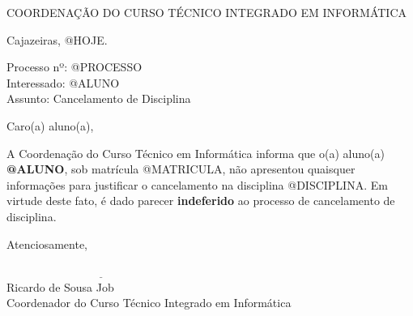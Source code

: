 \documentclass[a4paper, 12pt]{letter}
\begin{document}
{\bf
{\selectfont
    \begin{center}
        {\selectfont
            COORDENAÇÃO DO CURSO TÉCNICO INTEGRADO EM INFORMÁTICA
        }
    \end{center}
}

\begin{flushright}
Cajazeiras, @HOJE.
\end{flushright}

\noindent Processo nº: @PROCESSO\\
Interessado: @ALUNO\\
Assunto: Cancelamento de Disciplina


\noindent Caro(a) aluno(a),

\onehalfspacing A Coordenação do Curso Técnico em Informática informa que o(a) aluno(a) {\bf @ALUNO}, sob matrícula @MATRICULA, não apresentou quaisquer informações para justificar o cancelamento na disciplina @DISCIPLINA. Em virtude deste fato, é dado parecer {\bf indeferido} ao processo de cancelamento de disciplina. 


\noindent Atenciosamente,

\indent $\underline{\hspace{7cm}}$\\
\indent Ricardo de Sousa Job\\
\indent Coordenador do Curso Técnico Integrado em Informática\\
}
\end{document}
